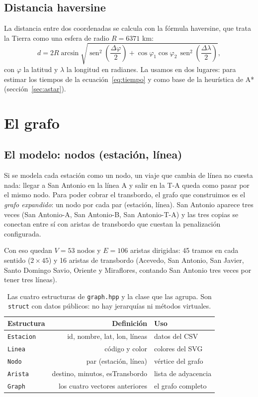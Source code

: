 \documentclass[11pt,a4paper]{article}
\newcommand{\arch}[1]{\texttt{#1}}
\begin{document}
\subsection{Distancia haversine}

La distancia entre dos coordenadas se calcula con la fórmula haversine, que trata
la Tierra como una esfera de radio $R = 6371$ km:
\begin{equation}
  d = 2R \arcsin\!\sqrt{\operatorname{sen}^2\!\left(\frac{\Delta\varphi}{2}\right)
      + \cos\varphi_1 \cos\varphi_2\,
        \operatorname{sen}^2\!\left(\frac{\Delta\lambda}{2}\right)},
\end{equation}
con $\varphi$ la latitud y $\lambda$ la longitud en radianes. La usamos en dos
lugares: para estimar los tiempos de la ecuación~\eqref{eq:tiempo} y como base de
la heurística de A* (sección~\ref{sec:astar}).

\section{El grafo}

\subsection{El modelo: nodos (estación, línea)}

Si se modela cada estación como un nodo, un viaje que cambia de línea no cuesta
nada: llegar a San Antonio en la línea A y salir en la T-A queda como pasar por el
mismo nodo. Para poder cobrar el transbordo, el grafo que construimos es el
\emph{grafo expandido}: un nodo por cada par (estación, línea). San Antonio
aparece tres veces (San Antonio-A, San Antonio-B, San Antonio-T-A) y las tres
copias se conectan entre sí con aristas de transbordo que cuestan la penalización
configurada.

Con eso quedan $V = 53$ nodos y $E = 106$ aristas dirigidas: 45 tramos en cada
sentido ($2 \times 45$) y 16 aristas de transbordo (Acevedo, San Antonio, San
Javier, Santo Domingo Savio, Oriente y Miraflores, contando San Antonio tres
veces por tener tres líneas).

\begin{table}[htbp]
\centering
\small
\begin{tabular}{lrl}
\toprule
Estructura & Definición & Uso \\
\midrule
\arch{Estacion} & id, nombre, lat, lon, líneas & datos del CSV \\
\arch{Linea}    & código y color & colores del SVG \\
\arch{Nodo}     & par (estación, línea) & vértice del grafo \\
\arch{Arista}   & destino, minutos, esTransbordo & lista de adyacencia \\
\arch{Graph}    & los cuatro vectores anteriores & el grafo completo \\
\bottomrule
\end{tabular}
\caption{Las cuatro estructuras de \arch{graph.hpp} y la clase que las agrupa. Son \arch{struct} con datos públicos: no hay jerarquías ni métodos virtuales.}
\end{table}
\end{document}
